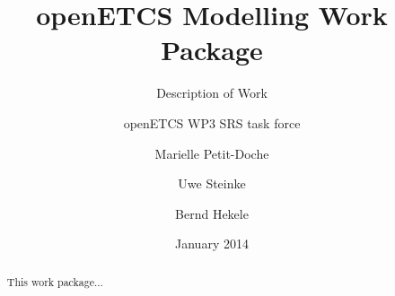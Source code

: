 \documentclass{template/openetcs_article}
\begin{document}
\frontmatter
{}




\title{openETCS Modelling Work Package}

\subtitle{Description of Work}

\date{January 2014}


\author{openETCS WP3 SRS task force}

 


\author{Marielle Petit-Doche}


\author{Uwe Steinke}


\author{Bernd Hekele}






\begin{abstract}

  This work package...



\end{abstract}

\maketitle
\tableofcontents
\listoffiguresandtables
\newpage



\end{document}
